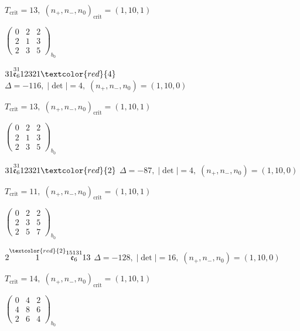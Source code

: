 \documentclass[10pt]{article}
\begin{document}
\hspace{1em}$T_{\text{crit}}=13,\; (n_+,n_-,n_0)_{\text{crit}}=(1,10,1)$

\hspace{2em}$\left(\begin{smallmatrix}0 & 2 & 2 \\ 2 & 1 & 3 \\ 2 & 3 & 5\end{smallmatrix}\right)_{\!b_0}$

\smallskip

$31\overset{31}{\mathfrak{e}_6}12321\textcolor{red}{4}$ \quad $\Delta=-116,\; |\det|=4,\; (n_+,n_-,n_0)=(1,10,0)$

\hspace{1em}$T_{\text{crit}}=13,\; (n_+,n_-,n_0)_{\text{crit}}=(1,10,1)$

\hspace{2em}$\left(\begin{smallmatrix}0 & 2 & 2 \\ 2 & 1 & 3 \\ 2 & 3 & 5\end{smallmatrix}\right)_{\!b_0}$

$31\overset{31}{\mathfrak{e}_6}12321\textcolor{red}{2}$ \quad $\Delta=-87,\; |\det|=4,\; (n_+,n_-,n_0)=(1,10,0)$

\hspace{1em}$T_{\text{crit}}=11,\; (n_+,n_-,n_0)_{\text{crit}}=(1,10,1)$

\hspace{2em}$\left(\begin{smallmatrix}0 & 2 & 2 \\ 2 & 3 & 5 \\ 2 & 5 & 7\end{smallmatrix}\right)_{\!b_0}$

\smallskip

$2\overset{\textcolor{red}{2}}{1}\overset{15131}{\mathfrak{e}_6}13$ \quad $\Delta=-128,\; |\det|=16,\; (n_+,n_-,n_0)=(1,10,0)$

\hspace{1em}$T_{\text{crit}}=14,\; (n_+,n_-,n_0)_{\text{crit}}=(1,10,1)$

\hspace{2em}$\left(\begin{smallmatrix}0 & 4 & 2 \\ 4 & 8 & 6 \\ 2 & 6 & 4\end{smallmatrix}\right)_{\!b_0}$
\end{document}
